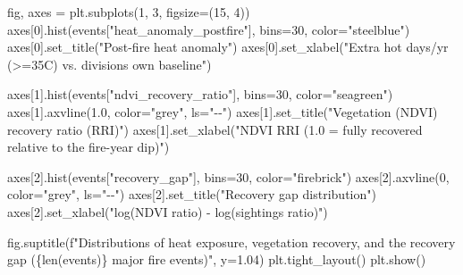 \documentclass[
  letterpaper,
  DIV=11,
  numbers=noendperiod]{scrartcl}
\newenvironment{Shaded}{\begin{snugshade}}{\end{snugshade}}
\newcommand{\BuiltInTok}[1]{\textcolor[rgb]{0.00,0.23,0.31}{#1}}
\newcommand{\DecValTok}[1]{\textcolor[rgb]{0.68,0.00,0.00}{#1}}
\newcommand{\FloatTok}[1]{\textcolor[rgb]{0.68,0.00,0.00}{#1}}
\newcommand{\NormalTok}[1]{\textcolor[rgb]{0.00,0.23,0.31}{#1}}
\newcommand{\OperatorTok}[1]{\textcolor[rgb]{0.37,0.37,0.37}{#1}}
\newcommand{\SpecialCharTok}[1]{\textcolor[rgb]{0.37,0.37,0.37}{#1}}
\newcommand{\SpecialStringTok}[1]{\textcolor[rgb]{0.13,0.47,0.30}{#1}}
\newcommand{\StringTok}[1]{\textcolor[rgb]{0.13,0.47,0.30}{#1}}
\begin{document}
\begin{Shaded}
\begin{Highlighting}[]
\NormalTok{fig, axes }\OperatorTok{=}\NormalTok{ plt.subplots(}\DecValTok{1}\NormalTok{, }\DecValTok{3}\NormalTok{, figsize}\OperatorTok{=}\NormalTok{(}\DecValTok{15}\NormalTok{, }\DecValTok{4}\NormalTok{))}
\NormalTok{axes[}\DecValTok{0}\NormalTok{].hist(events[}\StringTok{"heat\_anomaly\_postfire"}\NormalTok{], bins}\OperatorTok{=}\DecValTok{30}\NormalTok{, color}\OperatorTok{=}\StringTok{"steelblue"}\NormalTok{)}
\NormalTok{axes[}\DecValTok{0}\NormalTok{].set\_title(}\StringTok{"Post{-}fire heat anomaly"}\NormalTok{)}
\NormalTok{axes[}\DecValTok{0}\NormalTok{].set\_xlabel(}\StringTok{"Extra hot days/yr (\textgreater{}=35C) vs. division\textquotesingle{}s own baseline"}\NormalTok{)}

\NormalTok{axes[}\DecValTok{1}\NormalTok{].hist(events[}\StringTok{"ndvi\_recovery\_ratio"}\NormalTok{], bins}\OperatorTok{=}\DecValTok{30}\NormalTok{, color}\OperatorTok{=}\StringTok{"seagreen"}\NormalTok{)}
\NormalTok{axes[}\DecValTok{1}\NormalTok{].axvline(}\FloatTok{1.0}\NormalTok{, color}\OperatorTok{=}\StringTok{"grey"}\NormalTok{, ls}\OperatorTok{=}\StringTok{"{-}{-}"}\NormalTok{)}
\NormalTok{axes[}\DecValTok{1}\NormalTok{].set\_title(}\StringTok{"Vegetation (NDVI) recovery ratio (RRI)"}\NormalTok{)}
\NormalTok{axes[}\DecValTok{1}\NormalTok{].set\_xlabel(}\StringTok{"NDVI RRI (1.0 = fully recovered relative to the fire{-}year dip)"}\NormalTok{)}

\NormalTok{axes[}\DecValTok{2}\NormalTok{].hist(events[}\StringTok{"recovery\_gap"}\NormalTok{], bins}\OperatorTok{=}\DecValTok{30}\NormalTok{, color}\OperatorTok{=}\StringTok{"firebrick"}\NormalTok{)}
\NormalTok{axes[}\DecValTok{2}\NormalTok{].axvline(}\DecValTok{0}\NormalTok{, color}\OperatorTok{=}\StringTok{"grey"}\NormalTok{, ls}\OperatorTok{=}\StringTok{"{-}{-}"}\NormalTok{)}
\NormalTok{axes[}\DecValTok{2}\NormalTok{].set\_title(}\StringTok{"Recovery gap distribution"}\NormalTok{)}
\NormalTok{axes[}\DecValTok{2}\NormalTok{].set\_xlabel(}\StringTok{"log(NDVI ratio) {-} log(sightings ratio)"}\NormalTok{)}

\NormalTok{fig.suptitle(}\SpecialStringTok{f"Distributions of heat exposure, vegetation recovery, and the recovery gap (}\SpecialCharTok{\{}\BuiltInTok{len}\NormalTok{(events)}\SpecialCharTok{\}}\SpecialStringTok{ major fire events)"}\NormalTok{, y}\OperatorTok{=}\FloatTok{1.04}\NormalTok{)}
\NormalTok{plt.tight\_layout()}
\NormalTok{plt.show()}
\end{Highlighting}
\end{Shaded}
\end{document}
